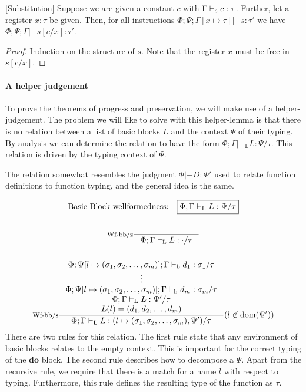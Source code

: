 \documentclass[a4paper, oneside, 10pt, draft]{memoir}
\begin{document}
\begin{lem}{[Substitution]}
  \label{lem:substitution}
  Suppose we are given a constant $c$ with $\Gamma |-_{\mathrm{c}} c :
  \tau$. Further, let a register $x : \tau$ be given. Then, for all
  instructions $\Phi;\Psi;\Gamma[x \mapsto \tau] |- s : \tau'$ we have
  $\Phi;\Psi;\Gamma |- s[c/x] : \tau'$.
\end{lem}
\begin{proof}
  Induction on the structure of $s$. Note that the register $x$ must
  be free in $s[c/x]$.
\end{proof}

\paragraph{A helper judgement}

\newcommand{\tpbb}{|-_{\mathrm{L}}}
To prove the theorems of progress and preservation, we will make use
of a helper-judgement. The problem we will like to solve with this
helper-lemma is that there is no relation between a list of basic
blocks $L$ and the context $\Psi$ of their typing. By analysis we can
determine the relation to have the form $\boxed{\Phi;\Gamma \tpbb L :
  \Psi / \tau}$. This relation is driven by the typing context of $\Psi$.

The relation somewhat resembles the judgment $\Phi |- D : \Phi'$ used
to relate function definitions to function typing, and the general
idea is the same.

\begin{gather*}
  \text{Basic Block wellformedness:} \quad \boxed{\Phi;\Gamma \tpbb
    L : \Psi / \tau}\\\\
  \inference[Wf-bb/z]{}{\Phi;\Gamma \tpbb L : \cdot / \tau}\\\\
  \inference[Wf-bb/s]{\Phi;\Psi[l\mapsto \sbundle];\Gamma \tpb d_1 :  \sigma_1 / \tau\\
  \vdots\\
  \Phi;\Psi[l\mapsto \sbundle];\Gamma \tpb d_m : \sigma_m / \tau\\
  \Phi;\Gamma \tpbb L : \Psi' / \tau\\
  L(l) = \dbundle}
  {\Phi;\Gamma \tpbb L : (l \mapsto \sbundle, \Psi') / \tau}(l \not \in \dom{\Psi'})
\end{gather*}
There are two rules for this relation. The first rule state that any
environment of basic blocks relates to the empty context. This is
important for the correct typing of the $\mathbf{do}$ block. The
second rule describes how to decompose a $\Psi$. Apart from the
recursive rule, we require that there is a match for a name $l$ with
respect to typing. Furthermore, this rule defines the resulting type
of the function as $\tau$.
\end{document}
